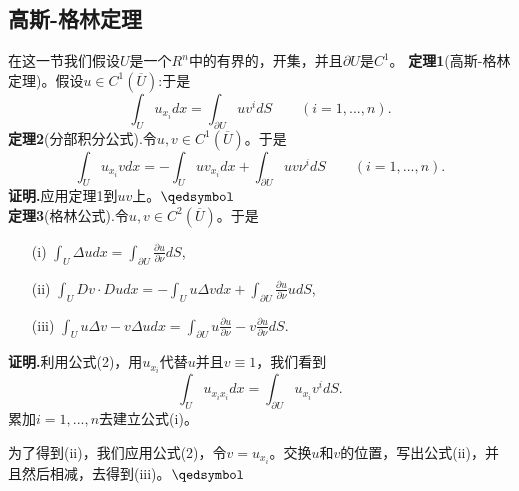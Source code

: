 \documentclass[leqno]{article}%
\begin{document}
\subsection{高斯-格林定理}
在这一节我们假设$U$是一个$R^{n}$中的有界的，开集，并且$\partial U$是$C^{1}$。
\textbf{定理1}(高斯-格林定理)。假设$u\in C^{1}\left(\overline{U}\right)$:于是
\begin{equation}
\int_{U}u_{x_{i}}dx=\int_{\partial U}uv^{i}dS\qquad (i=1,...,n).\tag{1}
\end{equation}
\textbf{定理2}(分部积分公式).令$u,v\in C^{1}\left(\overline{U}\right)$。于是
\begin{equation}
\int_{U}u_{x_{i}}vdx=-\int_{U}uv_{x_{i}}dx+\int_{\partial U}uv\nu^{i}dS\qquad (i=1,...,n).\tag{2}
\end{equation}
\textbf{证明.}应用定理1到$uv$上。$\hfill\qedsymbol$\\
\textbf{定理3}(格林公式).令$u,v\in C^{2}\left(\overline{U}\right)$。于是
\begin{enumerate}[itemindent=1em]
	\item[(i)]$\int_{U}\Delta udx=\int_{\partial U}\frac{\partial u}{\partial\nu}dS$,
	\item[(ii)]$\int_{U}Dv\cdot Dudx=-\int_{U}u\Delta vdx+\int_{\partial U}\frac{\partial u}{\partial\nu}udS$, 
	\item[(iii)]$\int_{U}u\Delta v-v\Delta udx=\int_{\partial U}u\frac{\partial u}{\partial\nu}-v\frac{\partial u}{\partial\nu}dS$.
\end{enumerate}
\textbf{证明.}利用公式(2)，用$u_{x_{i}}$代替$u$并且$v\equiv1$，我们看到
\begin{equation*}
\int_{U}u_{x_{i}x_{i}}dx=\int_{\partial U}u_{x_{i}}v^{i}dS.
\end{equation*}
累加$i=1,...,n$去建立公式(i)。\par
为了得到(ii)，我们应用公式(2)，令$v=u_{x_{i}}$。交换$u$和$v$的位置，写出公式(ii)，并且然后相减，去得到(iii)。$\hfill\qedsymbol$
\end{document}
